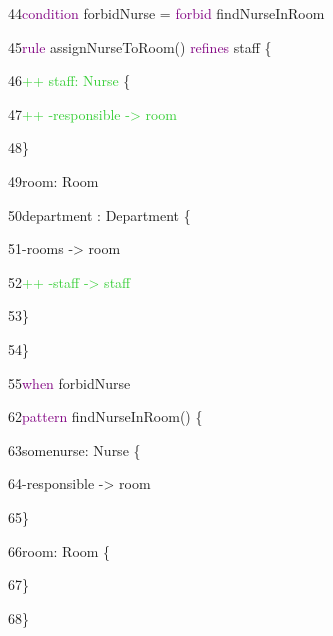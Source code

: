 {

 

44\hspace{0.5cm}\textcolor{Purple}{condition} forbidNurse = \textcolor{Purple}{forbid} findNurseInRoom 

45\hspace{0.5cm}\textcolor{Purple}{rule} assignNurseToRoom() \textcolor{Purple}{refines} staff \{ 

46\hspace{1cm}\textcolor{LimeGreen}{++ staff: Nurse} \{

47\hspace{1.5cm}\textcolor{LimeGreen}{++ -responsible -> room}

48\hspace{1cm}\}

49\hspace{1cm}room: Room

50\hspace{1cm}department : Department \{

51\hspace{1.5cm}-rooms -> room

52\hspace{1.5cm}\textcolor{LimeGreen}{++ -staff -> staff}

53\hspace{1cm}\}

54\hspace{0.5cm}\}

55\hspace{0.5cm}\textcolor{Purple}{when} forbidNurse\newline 

62\hspace{0.5cm}\textcolor{Purple}{pattern} findNurseInRoom() \{ 

63\hspace{1cm}somenurse: Nurse \{

64\hspace{1.5cm}-responsible -> room

65\hspace{1cm}\}

66\hspace{1cm}room: Room \{

67\hspace{1cm}\}

68\hspace{0.5cm}\} \newline\newline

}


